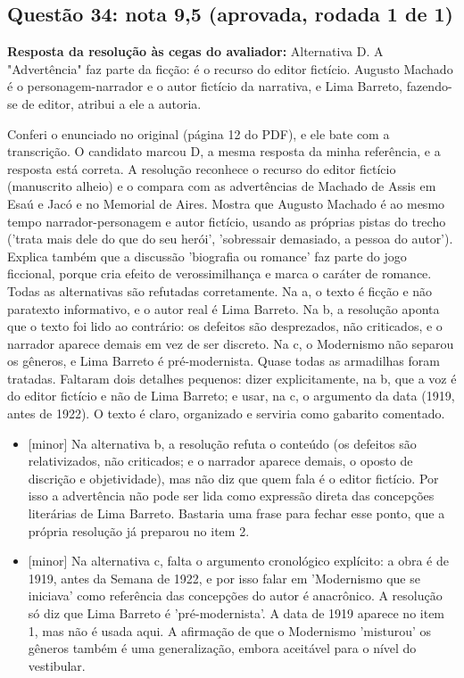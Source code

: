 \documentclass{article}%
\begin{document}
\subsection*{Questão 34: nota 9,5 (aprovada, rodada 1 de 1)}%
\textbf{Resposta da resolução às cegas do avaliador:} Alternativa D. A "Advertência" faz parte da ficção: é o recurso do editor fictício. Augusto Machado é o personagem{-}narrador e o autor fictício da narrativa, e Lima Barreto, fazendo{-}se de editor, atribui a ele a autoria.\par %
Conferi o enunciado no original (página 12 do PDF), e ele bate com a transcrição. O candidato marcou D, a mesma resposta da minha referência, e a resposta está correta. A resolução reconhece o recurso do editor fictício (manuscrito alheio) e o compara com as advertências de Machado de Assis em Esaú e Jacó e no Memorial de Aires. Mostra que Augusto Machado é ao mesmo tempo narrador{-}personagem e autor fictício, usando as próprias pistas do trecho ('trata mais dele do que do seu herói', 'sobressair demasiado, a pessoa do autor'). Explica também que a discussão 'biografia ou romance' faz parte do jogo ficcional, porque cria efeito de verossimilhança e marca o caráter de romance. Todas as alternativas são refutadas corretamente. Na a, o texto é ficção e não paratexto informativo, e o autor real é Lima Barreto. Na b, a resolução aponta que o texto foi lido ao contrário: os defeitos são desprezados, não criticados, e o narrador aparece demais em vez de ser discreto. Na c, o Modernismo não separou os gêneros, e Lima Barreto é pré{-}modernista. Quase todas as armadilhas foram tratadas. Faltaram dois detalhes pequenos: dizer explicitamente, na b, que a voz é do editor fictício e não de Lima Barreto; e usar, na c, o argumento da data (1919, antes de 1922). O texto é claro, organizado e serviria como gabarito comentado.%
\begin{itemize}%
\item%
{[}minor{]} Na alternativa b, a resolução refuta o conteúdo (os defeitos são relativizados, não criticados; e o narrador aparece demais, o oposto de discrição e objetividade), mas não diz que quem fala é o editor fictício. Por isso a advertência não pode ser lida como expressão direta das concepções literárias de Lima Barreto. Bastaria uma frase para fechar esse ponto, que a própria resolução já preparou no item 2.%
\item%
{[}minor{]} Na alternativa c, falta o argumento cronológico explícito: a obra é de 1919, antes da Semana de 1922, e por isso falar em 'Modernismo que se iniciava' como referência das concepções do autor é anacrônico. A resolução só diz que Lima Barreto é 'pré{-}modernista'. A data de 1919 aparece no item 1, mas não é usada aqui. A afirmação de que o Modernismo 'misturou' os gêneros também é uma generalização, embora aceitável para o nível do vestibular.%
\end{itemize}%
\end{document}
